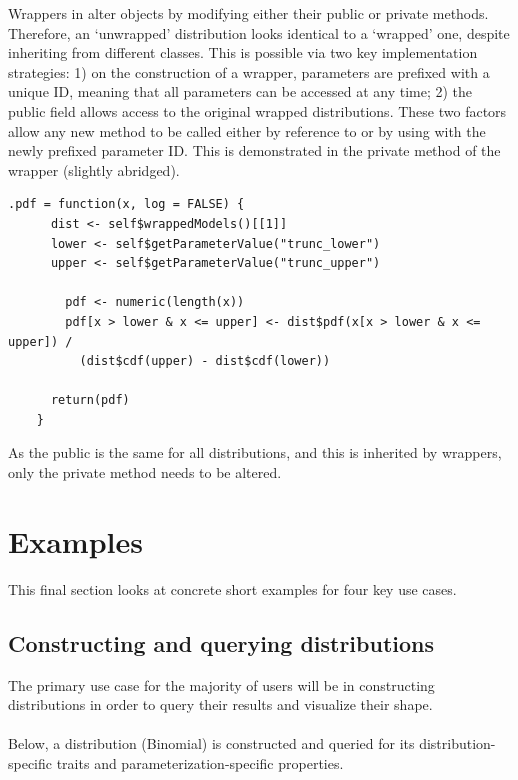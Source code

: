 Wrappers in  alter objects by modifying either their public or private methods. Therefore, an `unwrapped' distribution looks identical to a `wrapped' one, despite inheriting from different classes. This is possible via two key implementation strategies: 1) on the construction of a wrapper, parameters are prefixed with a unique ID, meaning that all parameters can be accessed at any time; 2) the  public field allows access to the original wrapped distributions. These two factors allow any new method to be called either by reference to  or by using  with the newly prefixed parameter ID. This is demonstrated in the  private method of the  wrapper (slightly abridged).

\begin{verbatim}
.pdf = function(x, log = FALSE) {
      dist <- self$wrappedModels()[[1]]
      lower <- self$getParameterValue("trunc_lower")
      upper <- self$getParameterValue("trunc_upper")

        pdf <- numeric(length(x))
        pdf[x > lower & x <= upper] <- dist$pdf(x[x > lower & x <= upper]) /
          (dist$cdf(upper) - dist$cdf(lower))

      return(pdf)
    }
\end{verbatim}

As the public  is the same for all distributions, and this is inherited by wrappers, only the private  method needs to be altered.

\section{Examples}

This final section looks at concrete short examples for four key use cases.

\subsection{Constructing and querying distributions}

The primary use case for the majority of users will be in constructing distributions in order to query their results and visualize their shape.
\\\\
Below, a distribution (Binomial) is constructed and queried for its distribution-specific traits and parameterization-specific properties.


